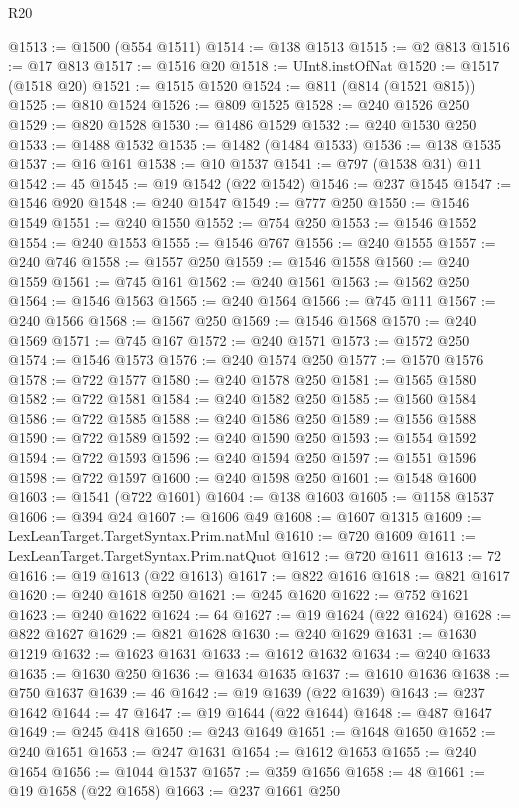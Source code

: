 \begin{lexlean}{R20}
\begin{coremodule}
@1513 := @1500 (@554 @1511)
@1514 := @138 @1513
@1515 := @2 @813
@1516 := @17 @813
@1517 := @1516 @20
@1518 := UInt8.instOfNat
@1520 := @1517 (@1518 @20)
@1521 := @1515 @1520
@1524 := @811 (@814 (@1521 @815))
@1525 := @810 @1524
@1526 := @809 @1525
@1528 := @240 @1526 @250
@1529 := @820 @1528
@1530 := @1486 @1529
@1532 := @240 @1530 @250
@1533 := @1488 @1532
@1535 := @1482 (@1484 @1533)
@1536 := @138 @1535
@1537 := @16 @161
@1538 := @10 @1537
@1541 := @797 (@1538 @31) @11
@1542 := 45
@1545 := @19 @1542 (@22 @1542)
@1546 := @237 @1545
@1547 := @1546 @920
@1548 := @240 @1547
@1549 := @777 @250
@1550 := @1546 @1549
@1551 := @240 @1550
@1552 := @754 @250
@1553 := @1546 @1552
@1554 := @240 @1553
@1555 := @1546 @767
@1556 := @240 @1555
@1557 := @240 @746
@1558 := @1557 @250
@1559 := @1546 @1558
@1560 := @240 @1559
@1561 := @745 @161
@1562 := @240 @1561
@1563 := @1562 @250
@1564 := @1546 @1563
@1565 := @240 @1564
@1566 := @745 @111
@1567 := @240 @1566
@1568 := @1567 @250
@1569 := @1546 @1568
@1570 := @240 @1569
@1571 := @745 @167
@1572 := @240 @1571
@1573 := @1572 @250
@1574 := @1546 @1573
@1576 := @240 @1574 @250
@1577 := @1570 @1576
@1578 := @722 @1577
@1580 := @240 @1578 @250
@1581 := @1565 @1580
@1582 := @722 @1581
@1584 := @240 @1582 @250
@1585 := @1560 @1584
@1586 := @722 @1585
@1588 := @240 @1586 @250
@1589 := @1556 @1588
@1590 := @722 @1589
@1592 := @240 @1590 @250
@1593 := @1554 @1592
@1594 := @722 @1593
@1596 := @240 @1594 @250
@1597 := @1551 @1596
@1598 := @722 @1597
@1600 := @240 @1598 @250
@1601 := @1548 @1600
@1603 := @1541 (@722 @1601)
@1604 := @138 @1603
@1605 := @1158 @1537
@1606 := @394 @24
@1607 := @1606 @49
@1608 := @1607 @1315
@1609 := LexLeanTarget.TargetSyntax.Prim.natMul
@1610 := @720 @1609
@1611 := LexLeanTarget.TargetSyntax.Prim.natQuot
@1612 := @720 @1611
@1613 := 72
@1616 := @19 @1613 (@22 @1613)
@1617 := @822 @1616
@1618 := @821 @1617
@1620 := @240 @1618 @250
@1621 := @245 @1620
@1622 := @752 @1621
@1623 := @240 @1622
@1624 := 64
@1627 := @19 @1624 (@22 @1624)
@1628 := @822 @1627
@1629 := @821 @1628
@1630 := @240 @1629
@1631 := @1630 @1219
@1632 := @1623 @1631
@1633 := @1612 @1632
@1634 := @240 @1633
@1635 := @1630 @250
@1636 := @1634 @1635
@1637 := @1610 @1636
@1638 := @750 @1637
@1639 := 46
@1642 := @19 @1639 (@22 @1639)
@1643 := @237 @1642
@1644 := 47
@1647 := @19 @1644 (@22 @1644)
@1648 := @487 @1647
@1649 := @245 @418
@1650 := @243 @1649
@1651 := @1648 @1650
@1652 := @240 @1651
@1653 := @247 @1631
@1654 := @1612 @1653
@1655 := @240 @1654
@1656 := @1044 @1537
@1657 := @359 @1656
@1658 := 48
@1661 := @19 @1658 (@22 @1658)
@1663 := @237 @1661 @250

\end{coremodule}
\end{lexlean}
